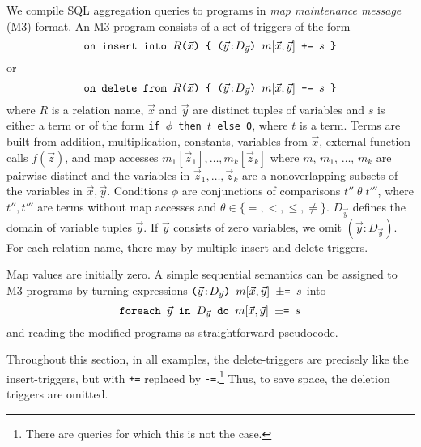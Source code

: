 We compile SQL aggregation queries to programs in {\em map maintenance
message}\/ (M3)  format. An M3 program consists of a set of triggers of
the form
\[
\mbox{{\tt on insert into $R$($\vec{x}$) \{
($\vec{y}$:$D_{\vec{y}}$) $m[\vec{x}, \vec{y}]$ += $s$
\}}}
\]
or
\[
\mbox{{\tt on delete from $R$($\vec{x}$) \{
($\vec{y}$:$D_{\vec{y}}$) $m[\vec{x}, \vec{y}]$ -= $s$
\}}}
\]
where $R$ is a relation name,
$\vec{x}$ and $\vec{y}$ are distinct tuples of variables and
$s$ is either a term or of the form
{\tt if $\phi$ then $t$ else 0}, where $t$ is a term.
Terms are built from addition, multiplication,
constants, variables from $\vec{x}$, external function calls $f(\vec{z})$,
and map accesses $m_1[\vec{z}_1], \dots, m_k[\vec{z}_k]$ where
$m$, $m_1$, $\dots$, $m_k$ are pairwise distinct
and the variables in $\vec{z}_1, \dots, \vec{z}_k$ are a nonoverlapping
subsets of the variables in $\vec{x}, \vec{y}$.
Conditions $\phi$ are conjunctions of comparisons $t'' \;\theta\; t'''$,
where $t'',t'''$ are terms without map accesses and
$\theta \in \{ =,<,\le,\neq \}$.
$D_{\vec{y}}$ defines the domain of variable tuples $\vec{y}$.
If $\vec{y}$ consists of zero variables, we omit $(\vec{y}: D_{\vec{y}})$.
For each relation name, there may by multiple insert and delete triggers.


Map values are initially zero. 
A simple sequential semantics can be assigned to M3 programs by turning
expressions
$
\mbox{{\tt ($\vec{y}$:$D_{\vec{y}}$) $m[\vec{x}, \vec{y}]$ $\pm$= $s$}}
$
into
\[
\mbox{{\tt foreach $\vec{y}$ in $D_{\vec{y}}$ do
$m[\vec{x}, \vec{y}]$ $\pm$= $s$}}
\]
and reading the modified programs as straightforward pseudocode.


Throughout this section, in all examples, the delete-triggers are precisely
like the insert-triggers, but with {\tt +=} replaced by
{\tt -=}.\footnote{There are queries for which this is not the case.}
Thus, to save space, the deletion triggers are omitted.


